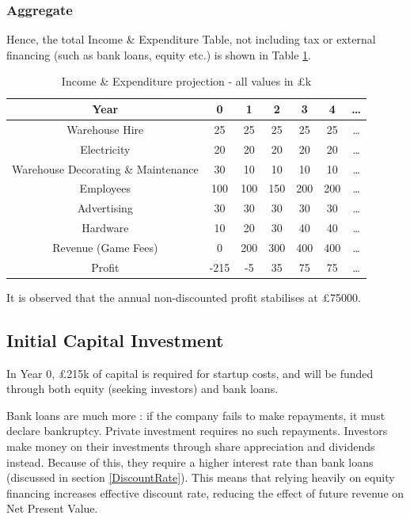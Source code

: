 \documentclass{report_template_oxford}
\begin{document}
\subsubsection{Aggregate}
Hence, the total Income \& Expenditure Table, not including tax or external financing (such as bank loans, equity etc.) is shown in Table \ref{tab:IE}.

\begin{table}[h]
\centering
\caption{Income \& Expenditure projection - all values in £k}
\begin{tabular}{|c| c c c c c c|}
\hline
Year & 0 & 1 & 2 & 3 & 4 & \dots \\
\hline
Warehouse Hire & 25 & 25 & 25 & 25 & 25 & \dots \\
Electricity & 20 & 20 & 20 & 20 & 20 & \dots \\
Warehouse Decorating \& Maintenance & 30 & 10 & 10 & 10 & 10 & \dots \\
Employees & 100 & 100 & 150 & 200 & 200 & \dots \\
Advertising & 30 & 30 & 30 & 30 & 30 & \dots \\
Hardware & 10 & 20 & 30 & 40 & 40 & \dots \\
\hline
Revenue (Game Fees) & 0 & 200 & 300 & 400 & 400 & \dots \\
\hline \hline
Profit & -215 & -5 & 35 & 75 & 75 & \dots \\
\hline
\end{tabular}
\label{tab:IE}
\end{table}

\noindent It is observed that the annual non-discounted profit stabilises at £75000. 

\subsection{Initial Capital Investment}

In Year 0, £215k of capital is required for startup costs, and will be funded through both equity (seeking investors) and bank loans.  \newline

\noindent Bank loans are much more : if the company fails to make repayments, it must declare bankruptcy. Private investment requires no such repayments. Investors make money on their investments through share appreciation and dividends instead. Because of this, they require a higher interest rate than bank loans (discussed in section \ref{DiscountRate}). This means that relying heavily on equity financing increases effective discount rate, reducing the effect of future revenue on Net Present Value. \newline
\end{document}
